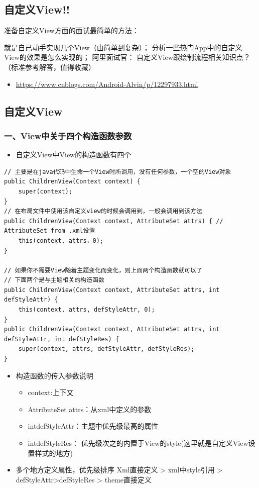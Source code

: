 \documentclass[9pt, b5paper]{article}
\begin{document}
\subsection{自定义View!!}
\label{sec-1-3}
准备自定义View方面的面试最简单的方法：

就是自己动手实现几个View（由简单到复杂）；
分析一些热门App中的自定义View的效果是怎么实现的；
阿里面试官： 自定义View跟绘制流程相关知识点？（标准参考解答，值得收藏）
\begin{itemize}
\item \url{https://www.cnblogs.com/Android-Alvin/p/12297933.html}
\end{itemize}

\subsection{自定义View}
\label{sec-1-4}
\subsubsection{一、View中关于四个构造函数参数}
\label{sec-1-4-1}
\begin{itemize}
\item 自定义View中View的构造函数有四个
\end{itemize}
\begin{verbatim}
// 主要是在java代码中生命一个View时所调用，没有任何参数，一个空的View对象
public ChildrenView(Context context) {
    super(context);
}
// 在布局文件中使用该自定义view的时候会调用到，一般会调用到该方法
public ChildrenView(Context context, AttributeSet attrs) { // AttributeSet from .xml设置
    this(context, attrs，0);
}

// 如果你不需要View随着主题变化而变化，则上面两个构造函数就可以了
// 下面两个是与主题相关的构造函数
public ChildrenView(Context context, AttributeSet attrs, int defStyleAttr) {
    this(context, attrs, defStyleAttr, 0);
}
public ChildrenView(Context context, AttributeSet attrs, int defStyleAttr, int defStyleRes) {
    super(context, attrs, defStyleAttr, defStyleRes);
}
\end{verbatim}
\begin{itemize}
\item 构造函数的传入参数说明
\begin{itemize}
\item context:上下文
\item AttributeSet attrs：从xml中定义的参数
\item intdefStyleAttr：主题中优先级最高的属性
\item intdefStyleRes： 优先级次之的内置于View的style(这里就是自定义View设置样式的地方)
\end{itemize}
\item 多个地方定义属性，优先级排序 Xml直接定义 > xml中style引用 > defStyleAttr>defStyleRes > theme直接定义
\end{itemize}
\end{document}
